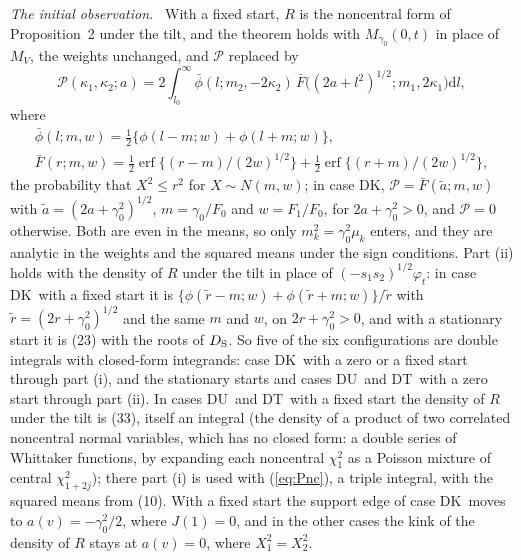 \documentclass[ecta,nameyear,final,supplement]{econsocart}
\newcommand{\dr}[1]{{\mathrm d}#1}
\newcommand{\erf}{\operatorname{erf}}
\newcommand{\Fk}{\textsf{\upshape DK}}
\newcommand{\Fu}{\textsf{\upshape DU}}
\newcommand{\Ft}{\textsf{\upshape DT}}
\newcommand{\cP}{\mathcal{P}}
\theoremstyle{plain}
\theoremstyle{definition}
\newcommand{\runin}[1]{\par\medskip\noindent\textit{#1.}\ \ignorespaces}
\begin{document}
\runin{The initial observation}  With a fixed start, $R$ is the noncentral form of Proposition~2 under the tilt, and the theorem holds with $M_{\gamma_0}(0,t)$ in place of $M_V$, the weights unchanged, and $\cP$ replaced by
\begin{equation}
\cP(\kappa_1,\kappa_2;a)=2\int_{l_0}^\infty\bar\phi(l;m_2,-2\kappa_2)\,\bar F\big((2a+l^2)^{1/2};m_1,2\kappa_1\big)\dr{l},
\label{eq:Pnc}
\end{equation}
where
\[
\begin{gathered}
\bar\phi(l;m,w)=\frac12\{\phi(l-m;w)+\phi(l+m;w)\},\\
\bar F(r;m,w)=\frac12\erf\{(r-m)/(2w)^{1/2}\}+\frac12\erf\{(r+m)/(2w)^{1/2}\},
\end{gathered}
\]
the probability that $X^2\le r^2$ for $X\sim N(m,w)$; in case \Fk, $\cP=\bar F(\tilde a;m,w)$ with $\tilde a=(2a+\gamma_0^2)^{1/2}$, $m=\gamma_0/F_0$ and $w=F_1/F_0$, for $2a+\gamma_0^2>0$, and $\cP=0$ otherwise.  Both are even in the means, so only $m_k^2=\gamma_0^2\mu_k$ enters, and they are analytic in the weights and the squared means under the sign conditions.  Part (ii) holds with the density of $R$ under the tilt in place of $(-s_1s_2)^{1/2}\varphi_t$: in case \Fk\ with a fixed start it is $\{\phi(\tilde r-m;w)+\phi(\tilde r+m;w)\}/\tilde r$ with $\tilde r=(2r+\gamma_0^2)^{1/2}$ and the same $m$ and $w$, on $2r+\gamma_0^2>0$, and with a stationary start it is (23) with the roots of $D_{\rm S}$.  So five of the six configurations are double integrals with closed-form integrands: case \Fk\ with a zero or a fixed start through part (i), and the stationary starts and cases \Fu\ and \Ft\ with a zero start through part (ii).  In cases \Fu\ and \Ft\ with a fixed start the density of $R$ under the tilt is (33), itself an integral (the density of a product of two correlated noncentral normal variables, which has no closed form: a double series of Whittaker functions, by expanding each noncentral $\chi^2_1$ as a Poisson mixture of central $\chi^2_{1+2j}$); there part (i) is used with (\ref{eq:Pnc}), a triple integral, with the squared means from (10).  With a fixed start the support edge of case \Fk\ moves to $a(v)=-\gamma_0^2/2$, where $J(1)=0$, and in the other cases the kink of the density of $R$ stays at $a(v)=0$, where $X_1^2=X_2^2$.
\end{document}
